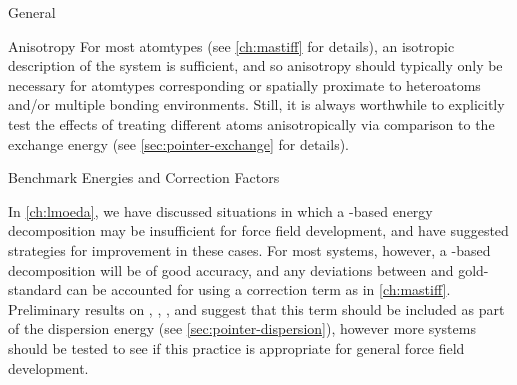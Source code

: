 \begin{subsection}{General}
\begin{paragraph}{Anisotropy}
For most atomtypes (see \cref{ch:mastiff} for details), an isotropic description of the system is
sufficient, and so anisotropy should typically only be necessary for
atomtypes corresponding or spatially proximate to heteroatoms and/or multiple
bonding environments. Still, it is always worthwhile to explicitly test the effects of treating
different atoms anisotropically via comparison to the \sapt exchange energy
(see \cref{sec:pointer-exchange} for details). 

\end{paragraph}

\begin{paragraph}{Benchmark Energies and Correction Factors}

In \cref{ch:lmoeda}, we have discussed situations in which a
\sapt-based energy decomposition may be insufficient for force field
development, and have suggested strategies for improvement in these cases. 
For most systems, however, a \sapt-based decomposition will be of good
accuracy, and any deviations between \sapt and gold-standard \ccsdt can be accounted for using a \dccsdt correction
term as in \cref{ch:mastiff}.
Preliminary results on \co, \cl, \ho, and \nh suggest that this \dccsdt term
should be included as part of the dispersion energy (see \cref{sec:pointer-dispersion}), however
more systems should be tested to see if this practice is appropriate for
general force field development.
\end{paragraph}

\end{subsection}
